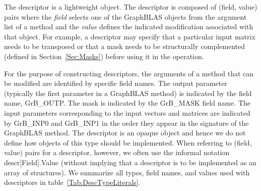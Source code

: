 The descriptor is a lightweight object.  The descriptor is composed
of (field, value) pairs where the \emph{field} selects one of the GraphBLAS objects
from the argument list of a method and the \emph{value} defines the indicated modification
associated with that object.  For example, a descriptor may specify that a particular 
input matrix needs to be transposed or that a mask needs to be structurally 
complemented (defined in Section~\ref{Sec:Masks}) before using it in the operation.

For the purpose of constructing descriptors, the arguments of a method
that can be modified are identified by specific field names. The output parameter (typically
the first parameter in a GraphBLAS method) is indicated by the field name, 
{\sf GrB\_OUTP}.  The mask is indicated by the {\sf GrB\_MASK} field name. The input parameters
corresponding to the input vectors and matrices are indicated by {\sf GrB\_INP0} and
{\sf GrB\_INP1} in the order they appear in the signature of the GraphBLAS method. 
The descriptor is an opaque object and hence we do not define how objects of this type should
be implemented.   When referring to (field, value) pairs for a descriptor, however, we often use the informal
notation {\sf descr[Field].Value} (without implying that a descriptor is to be implemented as an
array of structures).    We summarize all types, field names, and values used 
with descriptors in table~\ref{Tab:DescTypeLiterals}. 



